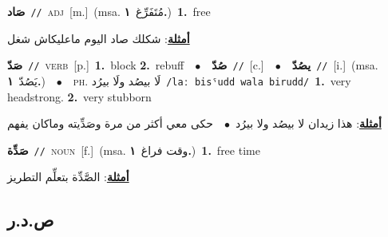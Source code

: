 \documentclass[10pt,a4paper,twoside]{article} %
\begin{document}
\begin{multicols}{2}
{\setlength\topsep{0pt}\textbf{\foreignlanguage{arabic}{صَاد}}\ {\color{gray}\texttt{//}\color{black}}\ \textsc{adj}\ [m.]\ \color{gray}(msa. \foreignlanguage{arabic}{مُتَفَرِّغ}~\foreignlanguage{arabic}{\textbf{١.}})\color{black}\ \textbf{1.}~free\  \begin{flushright}\color{gray}\foreignlanguage{arabic}{\textbf{\underline{\foreignlanguage{arabic}{أمثلة}}}: شكلك صاد اليوم ماعليكاش شغل}\end{flushright}\color{black}} \vspace{2mm}

{\setlength\topsep{0pt}\textbf{\foreignlanguage{arabic}{صَدّ}}\ {\color{gray}\texttt{//}\color{black}}\ \textsc{verb}\ [p.]\ \textbf{1.}~block  \textbf{2.}~rebuff\ \ $\bullet$\ \ \setlength\topsep{0pt}\textbf{\foreignlanguage{arabic}{صُدّ}}\ {\color{gray}\texttt{//}\color{black}}\ [c.]\ \ $\bullet$\ \ \setlength\topsep{0pt}\textbf{\foreignlanguage{arabic}{يصُدّ}}\ {\color{gray}\texttt{//}\color{black}}\ [i.]\ \color{gray}(msa. \foreignlanguage{arabic}{يَصُدّ}~\foreignlanguage{arabic}{\textbf{١.}})\color{black}\ \ $\bullet$\ \ \textsc{ph.} \color{gray} \foreignlanguage{arabic}{لَا بيصُد ولَا بيرُد}\color{black}\ {\color{gray}\texttt{/{\sffamily laː bisˤudd wala birudd}/}\color{black}}\ \textbf{1.}~very headstrong.  \textbf{2.}~very stubborn\  \begin{flushright}\color{gray}\foreignlanguage{arabic}{\textbf{\underline{\foreignlanguage{arabic}{أمثلة}}}: هذا زيدان لا بيصُد ولا بيرُد\ $\bullet$\ \  حكى معي أكثر من مرة وصَدِّيته وماكان يفهم}\end{flushright}\color{black}} \vspace{2mm}

{\setlength\topsep{0pt}\textbf{\foreignlanguage{arabic}{صَدِّة}}\ {\color{gray}\texttt{//}\color{black}}\ \textsc{noun}\ [f.]\ \color{gray}(msa. \foreignlanguage{arabic}{وقت فراغ}~\foreignlanguage{arabic}{\textbf{١.}})\color{black}\ \textbf{1.}~free time\  \begin{flushright}\color{gray}\foreignlanguage{arabic}{\textbf{\underline{\foreignlanguage{arabic}{أمثلة}}}: الصَّدِّة بتعلِّم التطريز}\end{flushright}\color{black}} \vspace{2mm}

\vspace{-3mm}
\subsection*{\color{blue}\foreignlanguage{arabic}{ص.د.ر}\color{blue}{}} 


\end{multicols}
\end{document}
